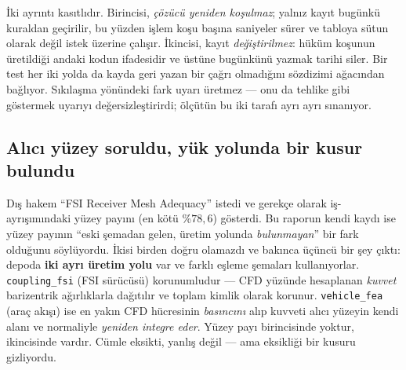 \documentclass[11pt,a4paper]{article}
\begin{document}
\noindent İki ayrıntı kasıtlıdır. Birincisi, \emph{çözücü yeniden
koşulmaz}; yalnız kayıt bugünkü kuraldan geçirilir, bu yüzden işlem koşu
başına saniyeler sürer ve tabloya sütun olarak değil istek üzerine
çalışır. İkincisi, kayıt \emph{değiştirilmez}: hüküm koşunun üretildiği
andaki kodun ifadesidir ve üstüne bugünkünü yazmak tarihi siler. Bir test
her iki yolda da kayda geri yazan bir çağrı olmadığını sözdizimi ağacından
bağlıyor. Sıkılaşma yönündeki fark uyarı üretmez --- onu da tehlike gibi
göstermek uyarıyı değersizleştirirdi; ölçütün bu iki tarafı ayrı ayrı
sınanıyor.

\subsection{Alıcı yüzey soruldu, yük yolunda bir kusur bulundu}
\label{sub:alici-yuzey}

Dış hakem ``FSI Receiver Mesh Adequacy'' istedi ve gerekçe olarak
iş-ayrışımındaki yüzey payını (en kötü \%$78{,}6$) gösterdi. Bu raporun
kendi kaydı ise yüzey payının ``eski şemadan gelen, üretim yolunda
\emph{bulunmayan}'' bir fark olduğunu söylüyordu. İkisi birden doğru
olamazdı ve bakınca üçüncü bir şey çıktı: depoda \textbf{iki ayrı üretim
yolu} var ve farklı eşleme şemaları kullanıyorlar. \texttt{coupling\_fsi}
(FSI sürücüsü) korunumludur --- CFD yüzünde hesaplanan \emph{kuvvet}
barizentrik ağırlıklarla dağıtılır ve toplam kimlik olarak korunur.
\texttt{vehicle\_fea} (araç akışı) ise en yakın CFD hücresinin
\emph{basıncını} alıp kuvveti alıcı yüzeyin kendi alanı ve normaliyle
\emph{yeniden integre eder}. Yüzey payı birincisinde yoktur, ikincisinde
vardır. Cümle eksikti, yanlış değil --- ama eksikliği bir kusuru
gizliyordu.
\end{document}
